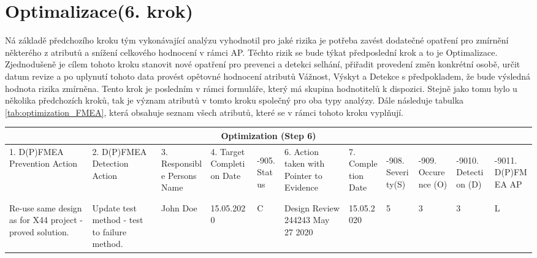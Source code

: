 \section{Optimalizace(6. krok)}
\label{sec:FMEA_postup_6}
Ná základě předchozího kroku tým vykonávající analýzu vyhodnotil pro jaké rizika je potřeba zavést dodatečné opatření pro zmírnění některého z atributů a snížení celkového hodnocení v rámci AP. Těchto rizik se bude týkat předposlední krok a to je Optimalizace. Zjednodušeně je cílem tohoto kroku stanovit nové opatření pro prevenci a detekci selhání, přiřadit provedení změn konkrétní osobě, určit datum revize a po uplynutí tohoto data provést opětovné hodnocení atributů Vážnost, Výskyt a Detekce s předpokladem, že bude výsledná hodnota rizika zmírněna. Tento krok je posledním v rámci formuláře, který má skupina hodnotitelů k dispozici. Stejně jako tomu bylo u několika předchozích kroků, tak je význam atributů v tomto kroku společný pro oba typy analýzy. Dále následuje tabulka \ref{tab:optimization_FMEA}, která obsahuje seznam všech atributů, které se v rámci tohoto kroku vyplňují.

\begin{sidewaystable}
	\centering
	\caption{Formulář pro Optimalizaci }
	\label{tab:optimization_FMEA}
\begin{tabular}{|p{2.5cm}|p{2.5cm}|p{2.5cm}|p{2cm}|p{0.5cm}|p{2cm}|p{2.5cm}|p{0.5cm}|p{0.5cm}|p{0.5cm}|p{0.5cm}| }
 \hline
 \multicolumn{11}{|c|}{Optimization (Step 6)} \\
 \hline
1. D(P)FMEA Prevention Action &
2. D(P)FMEA Detection Action &
3. Responsible Persons Name &
4. Target Completion Date &
\begin{turn}{-90}5. Status\end{turn} &
6. Action taken with Pointer to Evidence &
7. Completion Date &

\begin{turn}{-90}8. Severity(S)\end{turn} &
\begin{turn}{-90}9. Occurence (O)\end{turn} &
\begin{turn}{-90}10. Detection (D)\end{turn} &
\begin{turn}{-90}11. D(P)FMEA AP\end{turn}

\\
 \hline
Re-use same design as for X44 project - proved solution. &
Update test method - test to failure method.& 
John Doe & 
15.05.2020 &
C & 
Design Review 244243 May 27 2020 & 
15.05.2020 & 
5 & 
3 & 
3 & 
L 

\\
 \hline
\end{tabular}
\end{sidewaystable}

